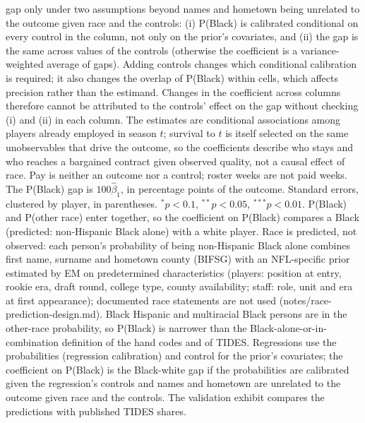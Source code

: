 {gap only under two assumptions beyond names and hometown being unrelated to the outcome given race and the controls: (i) P(Black) is calibrated conditional on every control in the column, not only on the prior's covariates, and (ii) the gap is the same across values of the controls (otherwise the coefficient is a variance-weighted average of gaps). Adding controls changes which conditional calibration is required; it also changes the overlap of P(Black) within cells, which affects precision rather than the estimand. Changes in the coefficient across columns therefore cannot be attributed to the controls' effect on the gap without checking (i) and (ii) in each column. The estimates are conditional associations among players already employed in season $t$; survival to $t$ is itself selected on the same unobservables that drive the outcome, so the coefficients describe who stays and who reaches a bargained contract given observed quality, not a causal effect of race. Pay is neither an outcome nor a control; roster weeks are not paid weeks. The P(Black) gap is $100\hat\beta_1$, in percentage points of the outcome. Standard errors, clustered by player, in parentheses. $^{*}p<0.1$, $^{**}p<0.05$, $^{***}p<0.01$. P(Black) and P(other race) enter together, so the coefficient on P(Black) compares a Black (predicted: non-Hispanic Black alone) with a white player. Race is predicted, not observed: each person's probability of being non-Hispanic Black alone combines first name, surname and hometown county (BIFSG) with an NFL-specific prior estimated by EM on predetermined characteristics (players: position at entry, rookie era, draft round, college type, county availability; staff: role, unit and era at first appearance); documented race statements are not used (notes/race-prediction-design.md). Black Hispanic and multiracial Black persons are in the other-race probability, so P(Black) is narrower than the Black-alone-or-in-combination definition of the hand codes and of TIDES. Regressions use the probabilities (regression calibration) and control for the prior's covariates; the coefficient on P(Black) is the Black-white gap if the probabilities are calibrated given the regression's controls and names and hometown are unrelated to the outcome given race and the controls. The validation exhibit compares the predictions with published TIDES shares.
\par}


